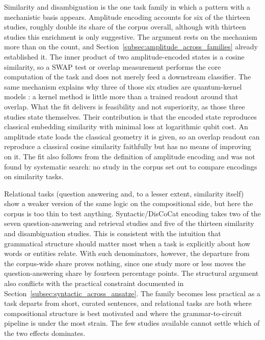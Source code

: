 \documentclass{ieeeaccess}
\begin{document}
Similarity and disambiguation is the one task family in which a pattern with a mechanistic basis appears. Amplitude encoding accounts for six of the thirteen studies, roughly double its share of the corpus overall, although with thirteen studies this enrichment is only suggestive.
The argument rests on the mechanism more than on the count, and Section~\ref{subsec:amplitude_across_families} already established it. The inner product of two amplitude-encoded states is a cosine similarity, so a SWAP test or overlap measurement performs the core computation of the task and does not merely feed a downstream classifier. The same mechanism explains why three of those six studies are quantum-kernel models \cite{cavar_word_2025,cavar_old_2026,cavar_semantic_2024}: a kernel method is little more than a trained readout around that overlap.
What the fit delivers is feasibility and not superiority, as those three studies state themselves. Their contribution is that the encoded state reproduces classical embedding similarity with minimal loss at logarithmic qubit cost. An amplitude state loads the classical geometry it is given, so an overlap readout can reproduce a classical cosine similarity faithfully but has no means of improving on it. The fit also follows from the definition of amplitude encoding and was not found by systematic search: no study in the corpus set out to compare encodings on similarity tasks.

Relational tasks (question answering and, to a lesser extent, similarity itself) show a weaker version of the same logic on the compositional side, but here the corpus is too thin to test anything.
Syntactic/DisCoCat encoding takes two of the seven question-answering and retrieval studies and five of the thirteen similarity and disambiguation studies. This is consistent with the intuition that grammatical structure should matter most when a task is explicitly about how words or entities relate. With such denominators, however, the departure from the corpus-wide share proves nothing, since one study more or less moves the question-answering share by fourteen percentage points.
The structural argument also conflicts with the practical constraint documented in Section~\ref{subsec:syntactic_across_ansatze}. The family becomes less practical as a task departs from short, curated sentences, and relational tasks are both where compositional structure is best motivated and where the grammar-to-circuit pipeline is under the most strain. The few studies available cannot settle which of the two effects dominates.
\end{document}
